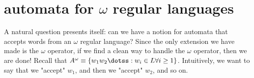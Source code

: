 \section{automata for  $\omega$ regular languages}

A natural question presents itself: can we have a notion for automata that accepts words from an $\omega$ regular language?
Since the only extension we have made is the $\omega$ operator, if we find a clean way to handle the $\omega$ operator, then we are done!
Recall that $A^\omega \equiv \{ w_1 w_2 \dotss : w_i \in L \forall i \geq 1 \}$.
Intuitively, we want to say that we "accept" $w_1$, and then we "accept" $w_2$, and so on.

